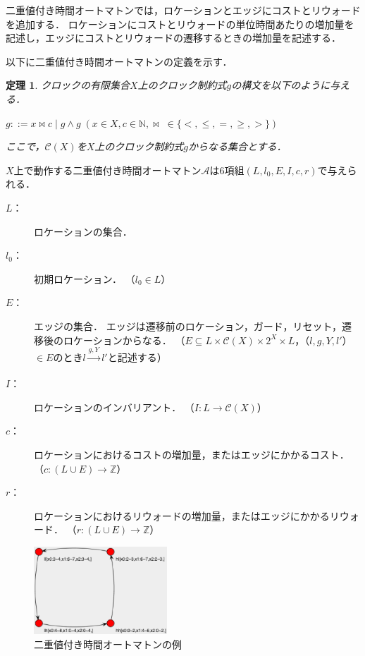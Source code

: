 \documentclass{ieicej}
\begin{document}
二重値付き時間オートマトンでは，ロケーションとエッジにコストとリウォードを追加する．
ロケーションにコストとリウォードの単位時間あたりの増加量を記述し，エッジにコストとリウォードの遷移するときの増加量を記述する．

以下に二重値付き時間オートマトンの定義を示す．

\newtheorem{teiri}{定理}
\begin{teiri}
	クロックの有限集合$X$上のクロック制約式$g$の構文を以下のように与える．

		$g ::= x \bowtie c \; | \; g \wedge g \; (x \in X, c \in \mathbb{N}, \bowtie \; \in \{<, \leq , =, \geq , >\})$
	
	ここで，$\mathcal{C}(X)$を$X$上のクロック制約式$g$からなる集合とする．
\end{teiri}

	$X$上で動作する二重値付き時間オートマトン$\mathcal{A}$は6項組$(L, l_0, E, I, c, r)$で与えられる．
	\begin{description}
			\item [$L$：] ロケーションの集合．
			\item [$l_0$：] 初期ロケーション．
			（$l_0 \in L$）
			\item [$E $：] エッジの集合．
			エッジは遷移前のロケーション，ガード，リセット，遷移後のロケーションからなる．
			（$E \subseteq L \times \mathcal{C}(X) \times 2^X \times L$，（$l, g, Y, l'$）$\in E$のとき$l \xrightarrow[]{g, Y} l'$と記述する）
			\item [$I$：] ロケーションのインバリアント．
			（$I : L \rightarrow \mathcal{C}(X)$）
			\item [$c$：] ロケーションにおけるコストの増加量，またはエッジにかかるコスト．
			（$c : (L \cup E) \rightarrow \mathbb{Z}$）
			\item [$r$：] ロケーションにおけるリウォードの増加量，またはエッジにかかるリウォード．
			（$r : (L \cup E) \rightarrow \mathbb{Z}$）
	\end{description}


\begin{figure}[tb]
	\begin{center}
		\includegraphics[width=50mm]{images/optimal.eps}
		\caption{二重値付き時間オートマトンの例}
		\label{fg:example21}
	\end{center}
\end{figure}
\end{document}
